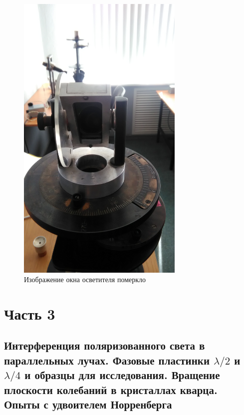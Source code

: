 \begin{figure}[H]
	\centering
	\includegraphics[width=8cm]{pic/b2.jpg}
	\caption{Изображение окна осветителя померкло}
	\label{fig:figure4}
\end{figure}

\section{Часть 3}
\subsection{Интерференция поляризованного света в параллельных лучах.
Фазовые пластинки $\lambda/2$ и $\lambda/4$ и образцы для исследования. Вращение плоскости колебаний в кристаллах кварца. Опыты с удвоителем Норренберга}

